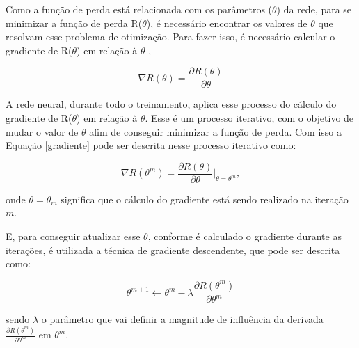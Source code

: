 Como a função de perda está relacionada com os parâmetros (\textbf{$\theta$}) da rede, para se minimizar a função de perda R(\textbf{$\theta$}), é necessário encontrar os valores de \textbf{$\theta$} que resolvam esse problema de otimização. Para fazer isso, é necessário calcular o gradiente de  R(\textbf{$\theta$}) em relação à \textbf{$\theta$} \cite{james2013introduction}, 

\begin{equation}
\nabla R(\theta) = \frac{\partial R(\theta)}{\partial \theta}     
\label{gradiente}
\end{equation}


A rede neural, durante todo o treinamento, aplica esse processo do cálculo do gradiente de R(\textbf{$\theta$}) em relação à \textbf{$\theta$}. Esse é um processo iterativo, com o objetivo de mudar o valor de $\theta$ afim de conseguir minimizar a função de perda. Com isso a Equação \ref{gradiente} pode ser descrita nesse processo iterativo como:

\[
\nabla R(\theta^m) = \frac{\partial R(\theta)}{\partial \theta} \bigg\rvert_{\theta = \theta^m},
\]

\hspace{-1.5cm}onde $\theta = \theta_m$ significa que o cálculo do gradiente está sendo realizado na iteração $m$.

E, para conseguir atualizar esse $\theta$, conforme é calculado o gradiente durante as iterações, é utilizada a técnica de gradiente descendente, que pode ser descrita como: 

\[
\theta^{m+1} \leftarrow \theta^{m} - \lambda\frac{\partial R(\theta^m)}{\partial \theta^m}
\]

\hspace{-1.5cm}sendo $\lambda$ o parâmetro que vai definir a magnitude de influência da derivada  $\frac{\partial R(\theta^m)}{\partial \theta^m}$ em $\theta^{m}$.


